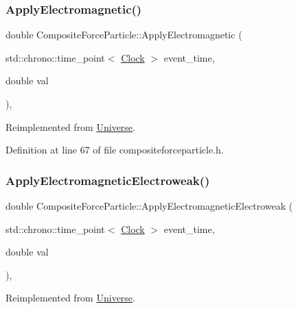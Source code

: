 \subsubsection{\texorpdfstring{Apply\+Electromagnetic()}{ApplyElectromagnetic()}}
{\footnotesize\ttfamily double Composite\+Force\+Particle\+::\+Apply\+Electromagnetic (\begin{DoxyParamCaption}\item[{std\+::chrono\+::time\+\_\+point$<$ \mbox{\hyperlink{universe_8h_a0ef8d951d1ca5ab3cfaf7ab4c7a6fd80}{Clock}} $>$}]{event\+\_\+time,  }\item[{double}]{val }\end{DoxyParamCaption})\hspace{0.3cm}{\ttfamily [inline]}, {\ttfamily [virtual]}}



Reimplemented from \mbox{\hyperlink{class_universe_a1f787da78fa196ba635db21a9e91dabb}{Universe}}.



Definition at line 67 of file compositeforceparticle.\+h.

\mbox{\label{class_composite_force_particle_a5f6aef9e15e2e5f346c7ede76ae6458b}} 
\subsubsection{\texorpdfstring{Apply\+Electromagnetic\+Electroweak()}{ApplyElectromagneticElectroweak()}}
{\footnotesize\ttfamily double Composite\+Force\+Particle\+::\+Apply\+Electromagnetic\+Electroweak (\begin{DoxyParamCaption}\item[{std\+::chrono\+::time\+\_\+point$<$ \mbox{\hyperlink{universe_8h_a0ef8d951d1ca5ab3cfaf7ab4c7a6fd80}{Clock}} $>$}]{event\+\_\+time,  }\item[{double}]{val }\end{DoxyParamCaption})\hspace{0.3cm}{\ttfamily [inline]}, {\ttfamily [virtual]}}



Reimplemented from \mbox{\hyperlink{class_universe_a4c36c1ab30db993307f88363dde5e8c5}{Universe}}.



